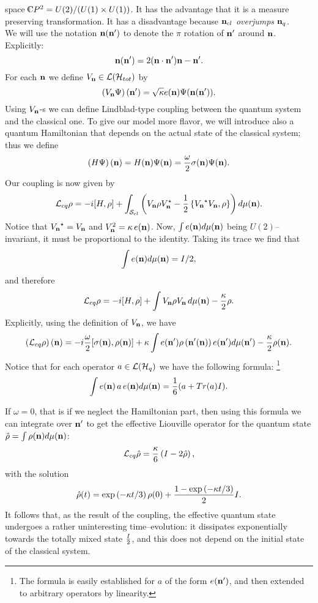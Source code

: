 \documentclass[12pt]{article}
\def\complex{{\kern .1em {\raise .47ex \hbox
{$\scriptscriptstyle
|$}}
\kern -.4em {\rm C}}}
\def\be{\begin{equation}} \def\ee{\end{equation}}
\begin{document}
space $\complex P^2=U (2)/ (U (1)\times U (1))$. 
It has
the advantage that it is a measure preserving transformation.  It has
a disadvantage because ${\bf n}_{cl}$ {\sl overjumps} ${\bf n}_q$.  \\
We will
use the notation ${\bf n} ({\bf n}')$ to denote the $\pi$ rotation of 
${\bf n}'$ around ${\bf n}$.  Explicitly: 
$${\bf n} ({\bf n}')=2 ({\bf n\cdot n}'){\bf n}-{\bf n}' . $$
For each ${\bf n}$ we define $V_{\bf n}\in {\cal L} ({\cal H}_{tot})$
by
\be
\left ( V_{\bf n}\Psi\right)
 ({\bf n}')=\sqrt{\kappa} e ({\bf n})\Psi ({\bf n} (
{\bf n}')). 
\ee
Using $V_{\bf n}$-s we can define Lindblad-type coupling between the quantum 
system and the classical one.  To give our model more flavor,  we will
introduce also a quantum Hamiltonian that depends on the actual state
of the classical system; thus we define
\be
\left ( H\Psi\right) ({\bf n})=
H ({\bf n})\Psi ({\bf n}) = {\omega\over2}\sigma  ({\bf n})\Psi  ({\bf n}). 
\ee
Our coupling is now given by
\be
{\cal L}_{cq} \rho = -i[H, \rho ] +\int_{{\cal S}_{cl}} \left ( V_{\bf n}\rho
V_{\bf n}^{\star}-{1\over2}
\left\{ {V_{\bf n}}^{\star} V_{\bf n}, \rho\right\}\right) d\mu  ({\bf n}). 
\ee 
Notice that ${V_{\bf n}}^{\star}=
V_{\bf n}$ and $V_{\bf n}^2=\kappa\,  e ({\bf n})$. 
Now, 
$\int e ({\bf n}) d\mu  ({\bf n})$ being $U (2)$--invariant,  it must be
proportional to the identity.  Taking its trace we find that
$$\int e ({\bf n}) d\mu  ({\bf n}) = I/2 , $$  
and therefore
\be
{\cal L}_{cq}\rho=-i[H, \rho]+\int  V_{\bf
n}\rho V_{\bf n}\,  d\mu  ({\bf n}) -{\kappa\over 2} \rho . 
\ee 
Explicitly,  using the definition of $V_{\bf n}$,  we have
\be
 \left ({\cal L}_{cq}\rho\right) ({\bf n}) =
 -i{\omega\over2}[\sigma ({\bf n}), \rho ({\bf n})]+
 \kappa\int e ({\bf n'})\rho\left ({\bf
n'}  ({\bf n})\right)e ({\bf n'}) d\mu  ({\bf n'}) -{\kappa\over 2} \rho ({\bf n}). 
\ee
Notice that for each operator $a\in{\cal L} ({\cal H}_q)$
we have the following formula: \footnote{The formula 
is easily established for $a$
of the form $e ({\bf n'})$,  and 
then extended to arbitrary operators by linearity. }
\be
\int e ({\bf n})\,  a\,  e ({\bf n}) d\mu  ({\bf n})={1\over 6} (a+Tr (a)I). 
\ee

If $\omega=0$,  that is if we neglect the Hamiltonian part,  then
using this formula we can integrate
over $ {\bf n'}$ to get the effective Liouville operator for the
quantum state ${\hat\rho}=\int \rho ({\bf n}) d\mu  ({\bf
n})$: 
\be
 {\cal L}_{cq}{\hat\rho}={\kappa\over6}\left (I-2{\hat\rho}\right), 
\ee
with the solution
\be
{\hat\rho} (t)=\exp\left ({-\kappa t}/3\right)\rho (0)+{1-\exp\left ({-\kappa
t}/3\right)\over 2}I. 
\ee
It follows that,  as the result of the coupling,  the effective quantum state
undergoes a rather uninteresting time--evolution:  it
dissipates exponentially towards the totally mixed state ${I\over2}$,  and this
 does not depend on the initial state of the classical system. \\
\end{document}
